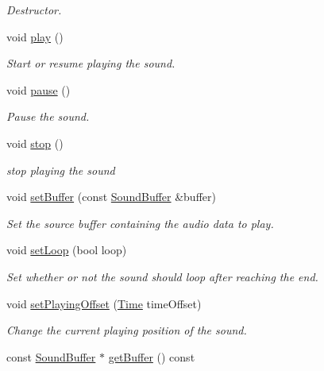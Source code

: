 \begin{DoxyCompactItemize}
\begin{DoxyCompactList}\small\item\em Destructor. \end{DoxyCompactList}\item 
void \hyperlink{classsf_1_1Sound_a2953ffe632536e72e696fd880ced2532}{play} ()
\begin{DoxyCompactList}\small\item\em Start or resume playing the sound. \end{DoxyCompactList}\item 
void \hyperlink{classsf_1_1Sound_a5eeb25815bfa8cdc4a6cc000b7b19ad5}{pause} ()
\begin{DoxyCompactList}\small\item\em Pause the sound. \end{DoxyCompactList}\item 
void \hyperlink{classsf_1_1Sound_aa9c91c34f7c6d344d5ee9b997511f754}{stop} ()
\begin{DoxyCompactList}\small\item\em stop playing the sound \end{DoxyCompactList}\item 
void \hyperlink{classsf_1_1Sound_a8b395e9713d0efa48a18628c8ec1972e}{set\-Buffer} (const \hyperlink{classsf_1_1SoundBuffer}{Sound\-Buffer} \&buffer)
\begin{DoxyCompactList}\small\item\em Set the source buffer containing the audio data to play. \end{DoxyCompactList}\item 
void \hyperlink{classsf_1_1Sound_af23ab4f78f975bbabac031102321612b}{set\-Loop} (bool loop)
\begin{DoxyCompactList}\small\item\em Set whether or not the sound should loop after reaching the end. \end{DoxyCompactList}\item 
void \hyperlink{classsf_1_1Sound_ab905677846558042022dd6ab15cddff0}{set\-Playing\-Offset} (\hyperlink{classsf_1_1Time}{Time} time\-Offset)
\begin{DoxyCompactList}\small\item\em Change the current playing position of the sound. \end{DoxyCompactList}\item 
const \hyperlink{classsf_1_1SoundBuffer}{Sound\-Buffer} $\ast$ \hyperlink{classsf_1_1Sound_a5f2f1ec6603f73625f393f0e9ab64476}{get\-Buffer} () const 

\end{DoxyCompactItemize}
